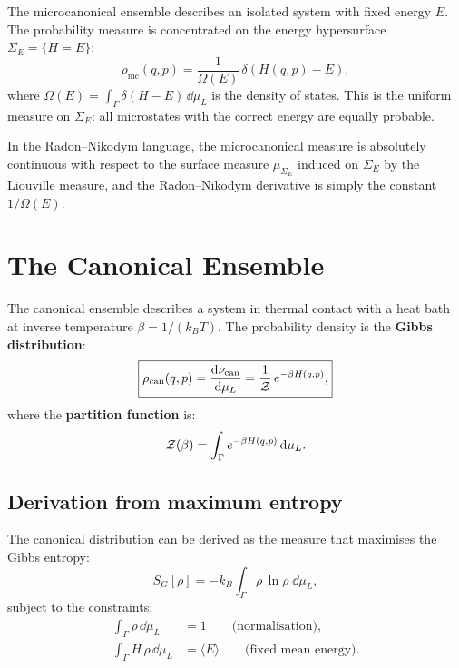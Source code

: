 The microcanonical ensemble describes an isolated system with fixed energy $E$. The probability measure is concentrated on the energy hypersurface $\Sigma_E = \{H = E\}$:
\begin{equation}
\rho_{\text{mc}}(q, p) = \frac{1}{\Omega(E)}\,\delta(H(q,p) - E),
\end{equation}
where $\Omega(E) = \int_\Gamma \delta(H - E)\,\dd\mu_L$ is the density of states. This is the uniform measure on $\Sigma_E$: all microstates with the correct energy are equally probable.

In the Radon--Nikodym language, the microcanonical measure is absolutely continuous with respect to the surface measure $\mu_{\Sigma_E}$ induced on $\Sigma_E$ by the Liouville measure, and the Radon--Nikodym derivative is simply the constant $1/\Omega(E)$.

\section{The Canonical Ensemble}

The canonical ensemble describes a system in thermal contact with a heat bath at inverse temperature $\beta = 1/(k_B T)$. The probability density is the \textbf{Gibbs distribution}:
\begin{equation}
\boxed{\rho_{\text{can}}(q, p) = \dv{\nu_{\text{can}}}{\mu_L} = \frac{1}{\mathcal{Z}}\,e^{-\beta H(q,p)},}
\end{equation}
where the \textbf{partition function} is:
\begin{equation}
\mathcal{Z}(\beta) = \int_\Gamma e^{-\beta H(q,p)}\,\dd\mu_L.
\end{equation}

\subsection{Derivation from maximum entropy}

The canonical distribution can be derived as the measure that maximises the Gibbs entropy:
\begin{equation}
S_G[\rho] = -k_B \int_\Gamma \rho\,\ln\rho\;\dd\mu_L,
\end{equation}
subject to the constraints:
\begin{align}
\int_\Gamma \rho\,\dd\mu_L &= 1 \qquad \text{(normalisation)}, \\
\int_\Gamma H\,\rho\,\dd\mu_L &= \langle E \rangle \qquad \text{(fixed mean energy)}.
\end{align}

